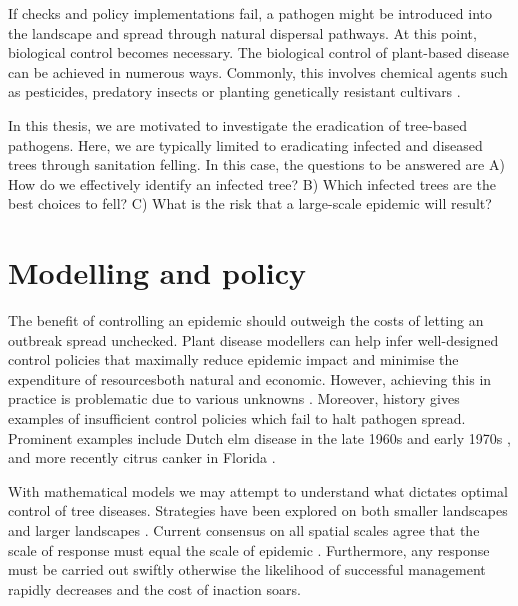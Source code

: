 If checks and policy implementations fail, a pathogen might be introduced into the landscape and spread through natural
dispersal pathways. At this point, biological control becomes necessary. The biological control of plant-based disease
can be achieved in numerous ways. Commonly, this involves chemical agents such as pesticides, predatory insects or planting
genetically resistant cultivars \cite{pal2006biological, baker1974biological}. 

In this thesis, we are motivated to investigate the eradication of tree-based pathogens. 
Here, we are typically limited to eradicating infected and diseased trees through sanitation felling. 
In this case, the questions to be answered are A) How do we effectively identify an infected tree? B) 
Which infected trees are the best choices to fell? C) What is the risk that a large-scale epidemic will result?


\section{Modelling and policy}


The benefit of controlling an epidemic should outweigh the costs of letting an outbreak spread unchecked. 
Plant disease modellers can help infer well-designed control policies that maximally reduce epidemic impact and minimise the expenditure
of resources\textemdash both natural and economic. However, achieving this in practice is problematic due to various unknowns \cite{13-challenges}.
Moreover, history gives examples of insufficient control policies which fail to halt pathogen spread. 
Prominent examples include Dutch elm disease in the late 1960s and early 1970s \cite{dutch-elm-mismanage}, 
and more recently citrus canker in Florida \cite{schubert2001meeting}.

With mathematical models we may attempt to understand what dictates optimal control of tree diseases. 
Strategies have been explored on both smaller landscapes \cite{WEBIDEMICS, risk-potential-control} 
and larger landscapes \cite{large-scale-control, large-scale-control2}. Current consensus on all spatial scales
agree that the scale of response must equal the scale of epidemic \cite{control-scale-matching}. Furthermore, 
any response must be carried out swiftly otherwise the likelihood of successful management rapidly decreases and the cost of inaction soars.

